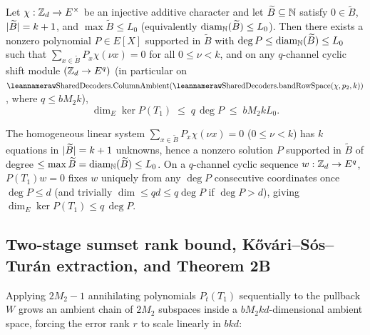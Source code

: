 \begin{lemma}\label{lem:sumset-poly}
Let $\chi : \mathbb{Z}_d \to E^\times$ be an injective additive character and let $\widetilde{B} \subseteq \mathbb{N}$
satisfy $0 \in \widetilde{B}$, $\lvert \widetilde{B} \rvert = k + 1$, and $\max \widetilde{B} \le L_0$
(equivalently $\operatorname{diam}_{\mathbb{N}}(\widetilde{B}) \le L_0$). Then there exists a nonzero polynomial
$P \in E[X]$ supported in $\widetilde{B}$ with $\deg P \le \operatorname{diam}_{\mathbb{N}}(\widetilde{B}) \le L_0$ such
that $\sum_{x \in \widetilde{B}} P_x \chi(\nu x) = 0$ for all $0 \le \nu < k$, and on any
$q$-channel cyclic shift module $(\mathbb{Z}_d \to E^q)$ (in particular on
$\leanname{SharedDecoders.ColumnAmbient}(\leanname{SharedDecoders.bandRowSpace}(\chi,p_2,k))$, where
$q \le b M_2 k$),
\[
  \dim_E \ker P(T_1) \;\le\; q\,\deg P \;\le\; b M_2 k L_0.
\]
\end{lemma}
\begin{outline}
The homogeneous linear system $\sum_{x \in \widetilde{B}} P_x \chi(\nu x) = 0$ ($0 \le \nu < k$) has
$k$ equations in $\lvert \widetilde{B} \rvert = k + 1$ unknowns, hence a nonzero solution $P$ supported in
$\widetilde{B}$ of degree $\le \max\widetilde{B} = \operatorname{diam}_{\mathbb{N}}(\widetilde{B}) \le L_0$. On a
$q$-channel cyclic sequence $w : \mathbb{Z}_d \to E^q$, $P(T_1)w = 0$ fixes $w$ uniquely from any $\deg P$
consecutive coordinates once $\deg P \le d$ (and trivially $\dim \le q d \le q \deg P$ if
$\deg P > d$), giving $\dim_E\ker P(T_1) \le q\,\deg P$.
\end{outline}

\subsection{Two-stage sumset rank bound, K\H{o}v\'ari--S\'os--Tur\'an extraction, and Theorem 2B}\label{sec:thm2b}

Applying $2M_2 - 1$ annihilating polynomials $P_t(T_1)$ sequentially to the pullback $W$ grows an
ambient chain of $2M_2$ subspaces inside a $b M_2 k d$-dimensional ambient space, forcing the error
rank $r$ to scale linearly in $b k d$:

